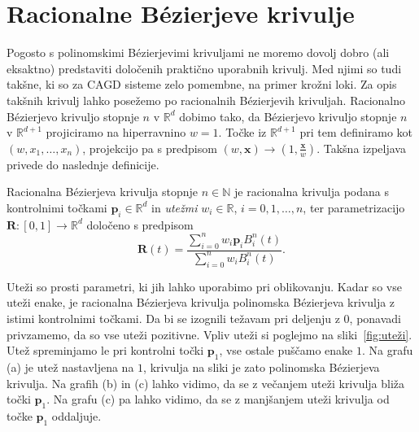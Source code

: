 \documentclass[isrm2, tisk]{fmfdelo}
\newcommand{\R}{\mathbb R}
\newcommand{\N}{\mathbb N}
\newcommand{\p}{\mathbf{p}}
\begin{document}
    \section{Racionalne Bézierjeve krivulje}
    Pogosto s polinomskimi Bézierjevimi krivuljami ne moremo dovolj dobro (ali eksaktno) predstaviti določenih praktično uporabnih krivulj.
    Med njimi so tudi takšne, ki so za CAGD sisteme zelo pomembne, na primer krožni loki.
    Za opis takšnih krivulj lahko posežemo po racionalnih Bézierjevih krivuljah.
    Racionalno Bézierjevo krivuljo stopnje $n$ v $\R^d$ dobimo tako, da Bézierjevo krivuljo stopnje $n$ v $\R^{d+1}$ projiciramo na hiperravnino $w=1$.
    Točke iz $\R^{d+1}$ pri tem definiramo kot $(w,x_1,\ldots,x_n)$, projekcijo pa s predpisom $(w,\mathbf{x})\to(1,\frac{\mathbf{x}}{w})$.
    Takšna izpeljava privede do naslednje definicije.
    \begin{definicija}
        \label{def:racionalna}
        Racionalna Bézierjeva krivulja stopnje $n\in\N$ je racionalna krivulja podana s kontrolnimi točkami $\p_i\in\R^d$ in \textit{utežmi} $w_i\in\R$, $i=0,1,\ldots,n$, ter parametrizacijo $\mathbf{R}:[0,1]\to \R^d$  določeno s predpisom \[\mathbf{R}(t) = \frac{\sum^{n}_{i=0}w_i\p_i B^n_i(t)}{\sum^{n}_{i=0}w_i B^n_i(t)}.\]
    \end{definicija}
    \noindent Uteži so prosti parametri, ki jih lahko uporabimo pri oblikovanju.
    Kadar so vse uteži enake, je racionalna Bézierjeva krivulja polinomska Bézierjeva krivulja z istimi kontrolnimi točkami.
    Da bi se izognili težavam pri deljenju z $0$, ponavadi privzamemo, da so vse uteži pozitivne.
    Vpliv uteži si poglejmo na sliki~\ref{fig:uteži}.
    Utež spreminjamo le pri kontrolni točki $\p_1$, vse ostale puščamo enake $1$.
    Na grafu (a) je utež nastavljena na $1$, krivulja na sliki je zato polinomska Bézierjeva krivulja.
    Na grafih (b) in (c) lahko vidimo, da se z večanjem uteži krivulja bliža točki $\p_1$.
    Na grafu (c) pa lahko vidimo, da se z manjšanjem uteži krivulja od točke $\p_1$ oddaljuje.
\end{document}
